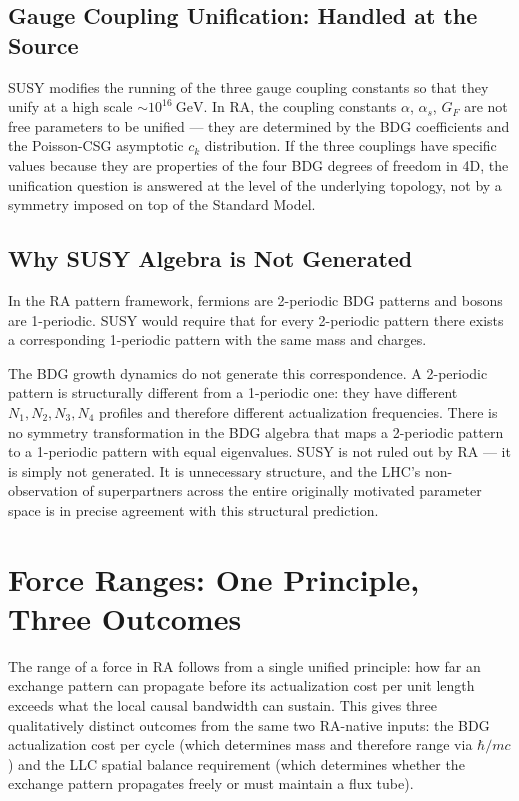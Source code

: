 \documentclass[11pt,a4paper]{article}
\begin{document}
\subsection{Gauge Coupling Unification: Handled at the Source}

SUSY modifies the running of the three gauge coupling constants so that they
unify at a high scale $\sim 10^{16}~\text{GeV}$. In RA, the coupling constants
$\alpha$, $\alpha_s$, $G_F$ are not free parameters to be unified --- they are
determined by the BDG coefficients and the Poisson-CSG asymptotic $c_k$
distribution. If the three couplings have specific values because they are
properties of the four BDG degrees of freedom in 4D, the unification question
is answered at the level of the underlying topology, not by a symmetry imposed
on top of the Standard Model.

\subsection{Why SUSY Algebra is Not Generated}

In the RA pattern framework, fermions are 2-periodic BDG patterns and bosons
are 1-periodic. SUSY would require that for every 2-periodic pattern there
exists a corresponding 1-periodic pattern with the same mass and charges.

The BDG growth dynamics do not generate this correspondence. A 2-periodic
pattern is structurally different from a 1-periodic one: they have different
$N_1, N_2, N_3, N_4$ profiles and therefore different actualization
frequencies. There is no symmetry transformation in the BDG algebra that
maps a 2-periodic pattern to a 1-periodic pattern with equal eigenvalues.
SUSY is not ruled out by RA --- it is simply not generated. It is unnecessary
structure, and the LHC's non-observation of superpartners across the entire
originally motivated parameter space is in precise agreement with this
structural prediction.

\section{Force Ranges: One Principle, Three Outcomes}
\label{sec:ranges}

The range of a force in RA follows from a single unified principle: how far
an exchange pattern can propagate before its actualization cost per unit
length exceeds what the local causal bandwidth can sustain. This gives three
qualitatively distinct outcomes from the same two RA-native inputs: the BDG
actualization cost per cycle (which determines mass and therefore range via
$\hbar/mc$) and the LLC spatial balance requirement (which determines whether
the exchange pattern propagates freely or must maintain a flux tube).
\end{document}
